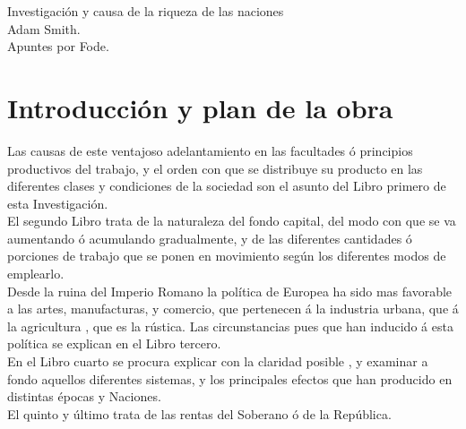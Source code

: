\documentclass[10pt]{article}
\begin{document}
\begin{center}
\huge Investigación y causa de la riqueza de las naciones\\
\vspace*{0.5cm}
\large Adam Smith.\\
\vspace{1cm}
\Large Apuntes por Fode.
\vspace{1.5cm}
\end{center}
\section*{Introducción y plan de la obra}
Las causas de este ventajoso adelantamiento en las facultades ó principios productivos del trabajo, y el orden con que se distribuye su producto en las diferentes clases y condiciones de la sociedad son el asunto del Libro primero de esta Investigación.\\
El segundo Libro trata de la naturaleza del fondo capital, del modo con que se va aumentando ó acumulando gradualmente, y de las diferentes cantidades ó porciones de trabajo que se ponen en movimiento según los diferentes modos de emplearlo.\\ 
Desde la ruina del Imperio Romano la política de Europea ha sido mas favorable a las artes, manufacturas, y comercio, que pertenecen á la industria urbana, que á la agricultura , que es la rústica. Las circunstancias pues que han inducido á esta política se explican en el Libro tercero.\\
En el Libro cuarto se procura explicar con la claridad posible , y examinar a fondo aquellos diferentes sistemas, y los principales efectos que han producido en distintas épocas y Naciones.\\
El quinto y último trata de las rentas del Soberano ó de la República.   
\end{document}

